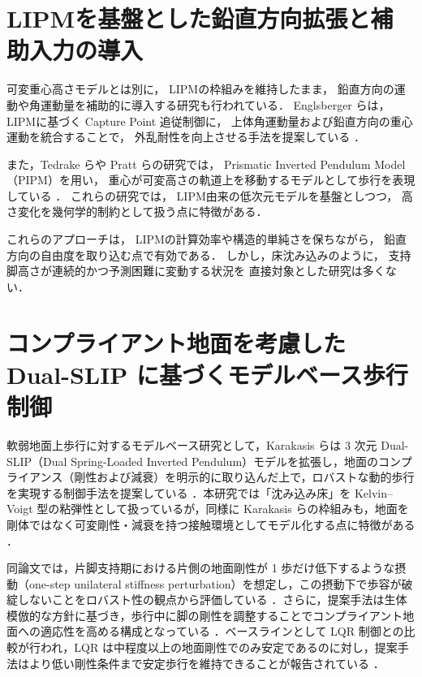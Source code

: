 \section{LIPMを基盤とした鉛直方向拡張と補助入力の導入}

可変重心高さモデルとは別に，
LIPMの枠組みを維持したまま，
鉛直方向の運動や角運動量を補助的に導入する研究も行われている．
Englsberger らは，
LIPMに基づく Capture Point 追従制御に，
上体角運動量および鉛直方向の重心運動を統合することで，
外乱耐性を向上させる手法を提案している \cite{englsberger2015}．

また，Tedrake らや Pratt らの研究では，
Prismatic Inverted Pendulum Model（PIPM）を用い，
重心が可変高さの軌道上を移動するモデルとして歩行を表現している
\cite{dai2014}．
これらの研究では，
LIPM由来の低次元モデルを基盤としつつ，
高さ変化を幾何学的制約として扱う点に特徴がある．

これらのアプローチは，
LIPMの計算効率や構造的単純さを保ちながら，
鉛直方向の自由度を取り込む点で有効である．
しかし，床沈み込みのように，
支持脚高さが連続的かつ予測困難に変動する状況を
直接対象とした研究は多くない．

\section{コンプライアント地面を考慮した Dual-SLIP に基づくモデルベース歩行制御}
\label{subsec:related_dualslip_compliant}

軟弱地面上歩行に対するモデルベース研究として，Karakasis らは 3 次元 Dual-SLIP（Dual Spring-Loaded Inverted Pendulum）モデルを拡張し，地面のコンプライアンス（剛性および減衰）を明示的に取り込んだ上で，ロバストな動的歩行を実現する制御手法を提案している \cite{karakasis2022med}．本研究では「沈み込み床」を Kelvin--Voigt 型の粘弾性として扱っているが，同様に Karakasis らの枠組みも，地面を剛体ではなく可変剛性・減衰を持つ接触環境としてモデル化する点に特徴がある \cite{karakasis2022med}．

同論文では，片脚支持期における片側の地面剛性が 1 歩だけ低下するような摂動（one-step unilateral stiffness perturbation）を想定し，この摂動下で歩容が破綻しないことをロバスト性の観点から評価している \cite{karakasis2022med}．さらに，提案手法は生体模倣的な方針に基づき，歩行中に脚の剛性を調整することでコンプライアント地面への適応性を高める構成となっている \cite{karakasis2022med}．ベースラインとして LQR 制御との比較が行われ，LQR は中程度以上の地面剛性でのみ安定であるのに対し，提案手法はより低い剛性条件まで安定歩行を維持できることが報告されている \cite{karakasis2022med}．

